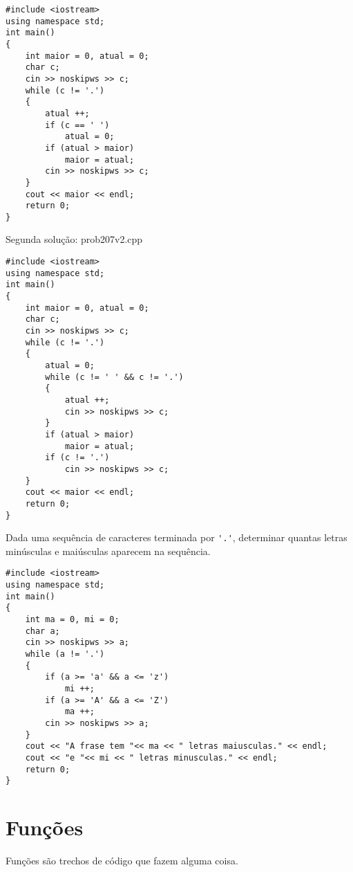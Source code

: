 \documentclass[a4paper]{memoir}
\begin{document}
\begin{sol}
\begin{lstlisting}
#include <iostream>
using namespace std;
int main()
{
    int maior = 0, atual = 0;
    char c;
    cin >> noskipws >> c;
    while (c != '.')
    {
        atual ++;
        if (c == ' ')
            atual = 0;
        if (atual > maior)
            maior = atual;
        cin >> noskipws >> c;
    }
    cout << maior << endl;
    return 0;
}
\end{lstlisting}

Segunda solução: prob207v2.cpp

\begin{lstlisting}
#include <iostream>
using namespace std;
int main()
{
    int maior = 0, atual = 0;
    char c;
    cin >> noskipws >> c;
    while (c != '.')
    {
        atual = 0;
        while (c != ' ' && c != '.')
        {
            atual ++;
            cin >> noskipws >> c;
        }
        if (atual > maior)
            maior = atual;
        if (c != '.')
            cin >> noskipws >> c;
    }
    cout << maior << endl;
    return 0;
}
\end{lstlisting}

\end{sol}

\begin{prob}\label{prob208.cpp}
Dada uma sequência de caracteres terminada por \verb|'.'|, determinar quantas letras minúsculas e maiúsculas aparecem na sequência.
\end{prob}

\begin{sol}
\begin{lstlisting}
#include <iostream>
using namespace std;
int main()
{
    int ma = 0, mi = 0;
    char a;
    cin >> noskipws >> a;
    while (a != '.')
    {
        if (a >= 'a' && a <= 'z')
            mi ++;
        if (a >= 'A' && a <= 'Z')
            ma ++;
        cin >> noskipws >> a;
    }
    cout << "A frase tem "<< ma << " letras maiusculas." << endl;
    cout << "e "<< mi << " letras minusculas." << endl;
    return 0;
}
\end{lstlisting}
\end{sol}

\section{Funções}

Funções são trechos de código que fazem alguma coisa.
\end{document}
